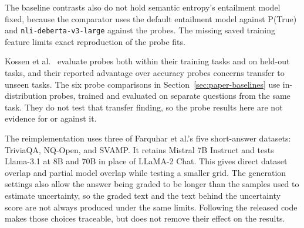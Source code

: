 The baseline contrasts also do not hold semantic entropy's
entailment model fixed, because the comparator uses the default entailment
model against P(True) and \texttt{nli-deberta-v3-large} against the probes. The
missing saved training feature limits exact reproduction of the probe fits.

Kossen et al.~\cite{kossen_semantic_entropy_probes_2024} evaluate probes both
within their training tasks and on held-out tasks, and their reported advantage
over accuracy probes concerns transfer to unseen tasks. The six probe
comparisons in Section~\ref{sec:paper-baselines} use in-distribution probes,
trained and evaluated on separate questions from the same task. They do not
test that transfer finding, so the probe results here are not evidence for or
against it.

The reimplementation uses three of Farquhar et al.'s five short-answer
datasets: TriviaQA, NQ-Open, and SVAMP. It retains Mistral 7B Instruct and
tests Llama-3.1 at 8B and 70B in place of LLaMA-2 Chat. This gives direct
dataset overlap and partial model overlap while testing a smaller grid. The
generation settings also allow the answer being graded to be longer than the
samples used to estimate uncertainty, so the graded text and the text behind
the uncertainty score are not always produced under the same limits. Following
the released code makes those choices traceable, but does not remove their
effect on the results.
